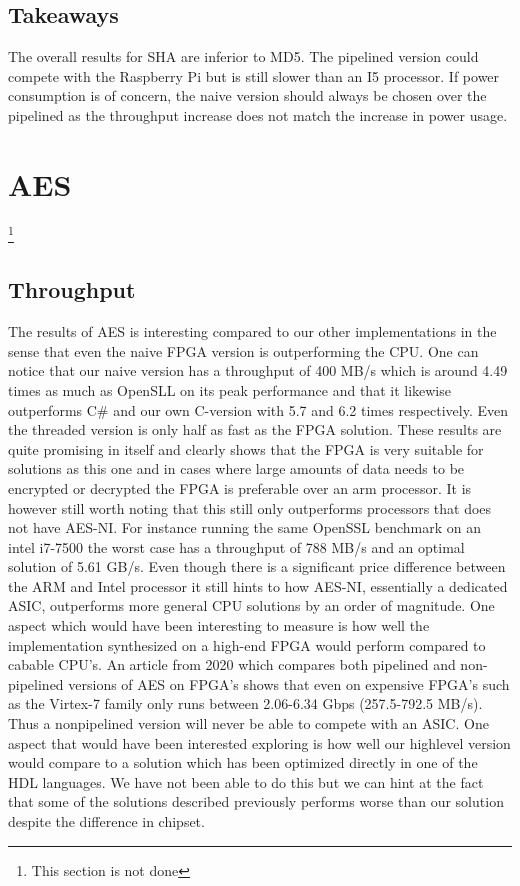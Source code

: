 \documentclass[a4paper, openany]{book}
\begin{document}
\begin{abstact}
\subsection{Takeaways}
\label{sec:org90d0bdb}
The overall results for SHA are inferior to MD5. The pipelined version could compete with the Raspberry Pi but is still slower than an I5 processor. If power consumption is of concern, the naive version should always be chosen over the pipelined as the throughput increase does not match the increase in power usage.
\section{AES}
\label{sec:orge1cba33}
\label{sec:AESperformance}
\footnote{This section is not done}
\subsection{Throughput}
\label{sec:org0b44bcf}
The results of AES is interesting compared to our other implementations in the sense that even the naive FPGA version is outperforming the CPU. One can notice that our naive version has a throughput of 400 MB/s which is around 4.49 times as much as OpenSLL on its peak performance and that it likewise outperforms C\# and our own C-version with 5.7 and 6.2 times respectively. Even the threaded version is only half as fast as the FPGA solution. These results are quite promising in itself and clearly shows that the FPGA is very suitable for solutions as this one and in cases where large amounts of data needs to be encrypted or decrypted the FPGA is preferable over an arm processor. It is however still worth noting that this still only outperforms processors that does not have AES-NI. For instance running the same OpenSSL benchmark on an intel i7-7500 the worst case has a throughput of 788 MB/s and an optimal solution of 5.61 GB/s. Even though there is a significant price difference between the ARM and Intel processor it still hints to how AES-NI, essentially a dedicated ASIC, outperforms more general CPU solutions by an order of magnitude. One aspect which would have been interesting to measure is how well the implementation synthesized on a high-end FPGA would perform compared to cabable CPU's. An article from 2020 which compares both pipelined and non-pipelined versions of AES on FPGA's shows that even on expensive FPGA's such as the Virtex-7 family only runs between 2.06-6.34 Gbps (257.5-792.5 MB/s)\cite{FPGA_AES}. Thus a nonpipelined version will never be able to compete with an ASIC. One aspect that would have been interested exploring is how well our highlevel version would compare to a solution which has been optimized directly in one of the HDL languages. We have not been able to do this but we can hint at the fact that some of the solutions described previously performs worse than our solution despite the difference in chipset.

\end{abstact}
\end{document}
